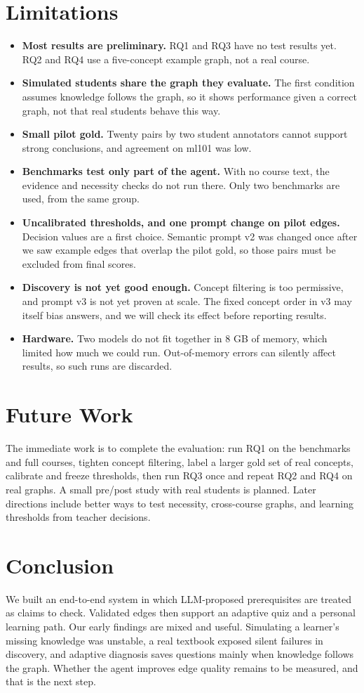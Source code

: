\documentclass[conference]{IEEEtran}
\begin{document}
\section{Limitations}
\begin{itemize}
\item \textbf{Most results are preliminary.} RQ1 and RQ3 have no test results yet. RQ2 and RQ4 use a five-concept example graph, not a real course.
\item \textbf{Simulated students share the graph they evaluate.} The first condition assumes knowledge follows the graph, so it shows performance given a correct graph, not that real students behave this way.
\item \textbf{Small pilot gold.} Twenty pairs by two student annotators cannot support strong conclusions, and agreement on ml101 was low.
\item \textbf{Benchmarks test only part of the agent.} With no course text, the evidence and necessity checks do not run there. Only two benchmarks are used, from the same group.
\item \textbf{Uncalibrated thresholds, and one prompt change on pilot edges.} Decision values are a first choice. Semantic prompt v2 was changed once after we saw example edges that overlap the pilot gold, so those pairs must be excluded from final scores.
\item \textbf{Discovery is not yet good enough.} Concept filtering is too permissive, and prompt v3 is not yet proven at scale. The fixed concept order in v3 may itself bias answers, and we will check its effect before reporting results.
\item \textbf{Hardware.} Two models do not fit together in 8 GB of memory, which limited how much we could run. Out-of-memory errors can silently affect results, so such runs are discarded.
\end{itemize}
\section{Future Work}
The immediate work is to complete the evaluation: run RQ1 on the benchmarks and full courses, tighten concept filtering, label a larger gold set of real concepts, calibrate and freeze thresholds, then run RQ3 once and repeat RQ2 and RQ4 on real graphs. A small pre/post study with real students is planned. Later directions include better ways to test necessity, cross-course graphs, and learning thresholds from teacher decisions.

\section{Conclusion}
We built an end-to-end system in which LLM-proposed prerequisites are treated as claims to check. Validated edges then support an adaptive quiz and a personal learning path. Our early findings are mixed and useful. Simulating a learner's missing knowledge was unstable, a real textbook exposed silent failures in discovery, and adaptive diagnosis saves questions mainly when knowledge follows the graph. Whether the agent improves edge quality remains to be measured, and that is the next step.
\end{document}
